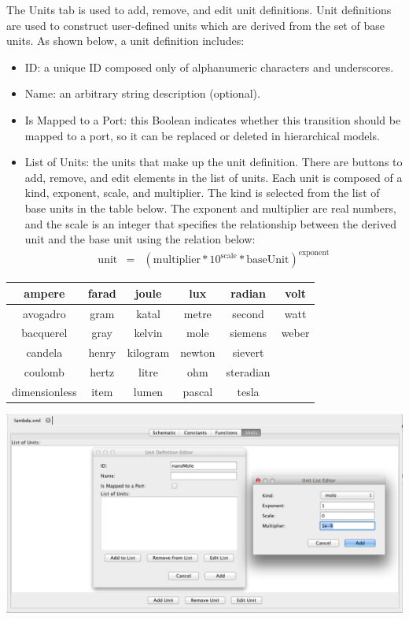 \documentclass[titlepage,11pt]{article}
\begin{document}
\noindent
The Units tab is used to add, remove, and edit unit definitions.  Unit definitions are used to construct user-defined units which are derived from the set of base units.  As shown below, a unit definition includes:
\begin{itemize}
\item ID: a unique ID composed only of alphanumeric characters and underscores.
\item Name: an arbitrary string description (optional).
\item Is Mapped to a Port: this Boolean indicates whether this transition should be mapped to a port, so it can be replaced or deleted in hierarchical models.
\item List of Units: the units that make up the unit definition.  There are buttons to add, remove, and edit elements in the list of units.  Each unit is composed of a kind, exponent, scale, and multiplier.  The kind is selected from the list of base units in the table below.  The exponent and multiplier are real numbers, and the scale is an integer that specifies the relationship between the derived unit and the base unit using the relation below:
\begin{eqnarray*}
\mathrm{unit} & = & (\mathrm{multiplier} * 10^\mathrm{scale} * \mathrm{baseUnit})^\mathrm{exponent}
\end{eqnarray*}
\end{itemize}

\begin{center}
\begin{tabular}{|c|c|c|c|c|c|}
\hline
ampere        & farad  & joule    & lux  & radian    & volt \\ \hline
avogadro     & gram  & katal   & metre   & second   & watt \\ \hline
bacquerel       & gray & kelvin & mole & siemens   & weber \\ \hline
candela       & henry & kilogram    & newton    & sievert & ~\\ \hline
coulomb & hertz  & litre    & ohm & steradian     & ~\\ \hline
dimensionless         & item & lumen      & pascal & tesla      & ~\\ \hline
\end{tabular}
\end{center}

\begin{center}
\includegraphics[width=160mm]{screenshots/units}
\end{center}
\end{document}
